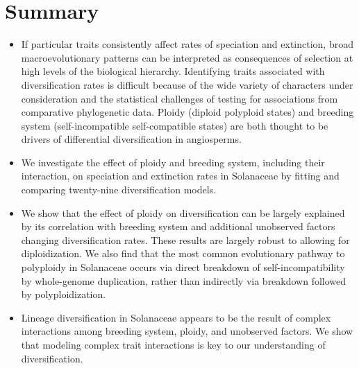 \section{Summary}

\begin{itemize}
\item If particular traits consistently affect rates of speciation and extinction, broad macroevolutionary patterns can be interpreted as consequences of selection at high levels of the biological hierarchy.
Identifying traits associated with diversification rates is difficult because of the wide variety of characters under consideration and the statistical challenges of testing for associations from comparative phylogenetic data.
Ploidy (diploid \vs polyploid states) and breeding system (self-incompatible \vs self-compatible states) are both thought to be drivers of differential diversification in angiosperms. %

\item  We investigate the effect of ploidy and breeding system, including their interaction, on speciation and extinction rates in Solanaceae by fitting and comparing twenty-nine diversification models. %

\item We show that the effect of ploidy on diversification can be largely explained by its correlation with breeding system and additional unobserved factors changing diversification rates. %
These results are largely robust to allowing for diploidization.  %
We also find that the most common evolutionary pathway to polyploidy in Solanaceae occurs via direct breakdown of self-incompatibility by whole-genome duplication, rather than indirectly via breakdown followed by polyploidization.

\item  Lineage diversification in Solanaceae appears to be the result of complex interactions among breeding system, ploidy, and unobserved factors. 
We show that modeling complex trait interactions is key to our understanding of diversification.        %
\end{itemize}